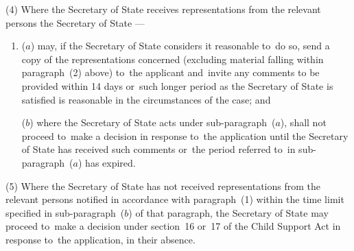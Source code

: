 \documentclass[12pt,a4paper]{article}
\begin{document}
(4) Where the 
Secretary of State  %
receives representations from the relevant persons 
the Secretary of State%
—
\begin{enumerate}\item[]
($a$) may, if 
the Secretary of State  %
considers it reasonable to~do so, send a copy of the representations concerned (excluding material falling within paragraph~(2) above) to~the applicant and~invite any comments 
to be provided  %
within 14 days or~such longer period as the 
Secretary of State  %
is satisfied is reasonable in the circumstances of the case; and

($b$) where the 
Secretary of State  %
acts under sub-paragraph~($a$), shall not proceed to~make a decision in response to~the application until 
the Secretary of State  %
has received such comments or~the period referred to~in sub-paragraph~($a$)  has expired.
\end{enumerate}

(5) Where the 
Secretary of State  %
has not received representations from the relevant persons notified in accordance with paragraph~(1) within the time limit specified in sub-paragraph~($b$)  of that paragraph, 
the Secretary of State  %
may proceed to~make a decision under section~16 or~17 of the Child Support Act in response to~the application, in their absence.
\end{document}
